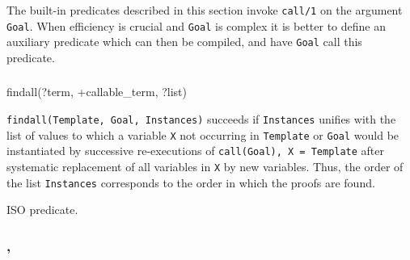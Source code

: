 The built-in predicates described in this section invoke \texttt{call/1}
 on the argument \texttt{Goal}. When efficiency is crucial
and \texttt{Goal} is complex it is better to define an auxiliary predicate
which can then be compiled, and have \texttt{Goal} call this predicate.

\subsubsection{}

\begin{TemplatesOneCol}
findall(?term, +callable\_term, ?list)

\end{TemplatesOneCol}

\Description

\texttt{findall(Template, Goal, Instances)} succeeds if \texttt{Instances}
unifies with the list of values to which a variable \texttt{X} not occurring
in \texttt{Template} or \texttt{Goal} would be instantiated by successive
re-executions of \texttt{call(Goal), X = Template} after systematic
replacement of all variables in \texttt{X} by new variables. Thus, the order
of the list \texttt{Instances} corresponds to the order in which the proofs
are found.

\begin{PlErrors}





\end{PlErrors}

\Portability

ISO predicate.

\subsubsection{,
               }

